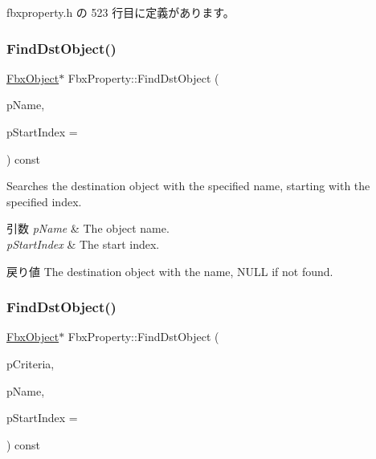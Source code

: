  fbxproperty.\+h の 523 行目に定義があります。

\mbox{\label{class_fbx_property_a5c816ef8651dedd41022121ed073eeaa}} 
\subsubsection{\texorpdfstring{Find\+Dst\+Object()}{FindDstObject()}\hspace{0.1cm}{\footnotesize\ttfamily [1/4]}}
{\footnotesize\ttfamily \hyperlink{class_fbx_object}{Fbx\+Object}$\ast$ Fbx\+Property\+::\+Find\+Dst\+Object (\begin{DoxyParamCaption}\item[{const char $\ast$}]{p\+Name,  }\item[{const int}]{p\+Start\+Index = {} }\end{DoxyParamCaption}) const}

Searches the destination object with the specified name, starting with the specified index. 
\begin{DoxyParams}{引数}
{\em p\+Name} & The object name. \\
\hline
{\em p\+Start\+Index} & The start index. \\
\hline
\end{DoxyParams}
\begin{DoxyReturn}{戻り値}
The destination object with the name, N\+U\+LL if not found. 
\end{DoxyReturn}
\mbox{\label{class_fbx_property_a7cdf86294b2b1dc3ec1e98bbb3bf2c87}} 
\subsubsection{\texorpdfstring{Find\+Dst\+Object()}{FindDstObject()}\hspace{0.1cm}{\footnotesize\ttfamily [2/4]}}
{\footnotesize\ttfamily \hyperlink{class_fbx_object}{Fbx\+Object}$\ast$ Fbx\+Property\+::\+Find\+Dst\+Object (\begin{DoxyParamCaption}\item[{const \hyperlink{class_fbx_criteria}{Fbx\+Criteria} \&}]{p\+Criteria,  }\item[{const char $\ast$}]{p\+Name,  }\item[{const int}]{p\+Start\+Index = {} }\end{DoxyParamCaption}) const}

